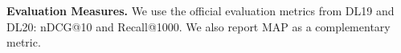 \textbf{Evaluation Measures.} We use the official evaluation metrics from DL19 and DL20: nDCG@10 and Recall@1000. We also report MAP as a complementary metric.


